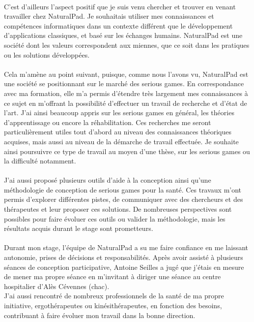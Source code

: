 \paragraph{} C'est d'ailleurs l'aspect positif que je suis venu chercher et trouver en venant travailler chez NaturalPad. Je souhaitais utiliser mes connaissances et compétences informatiques dans un contexte différent que le développement d'applications classiques, et basé sur les échanges humains. NaturalPad est une société dont les valeurs correspondent aux miennes, que ce soit dans les pratiques ou les solutions développées.

\paragraph{} Cela m'amène au point suivant, puisque, comme nous l'avons vu, NaturalPad est une société se positionnant sur le marché des serious games. En correspondance avec ma formation, elle m'a permis d'étendre très largement mes connaissances à ce sujet en m'offrant la possibilité d'effectuer un travail de recherche et d'état de l'art. J'ai ainsi beaucoup appris sur les serious games en général, les théories d'apprentissage ou encore la réhabilitation. Ces recherches me seront particulièrement utiles tout d'abord au niveau des connaissances théoriques acquises, mais aussi au niveau de la démarche de travail effectuée. Je souhaite ainsi poursuivre ce type de travail au moyen d'une thèse, sur les serious games ou la difficulté notamment. 

\paragraph{} J'ai aussi proposé plusieurs outils d'aide à la conception ainsi qu'une méthodologie de conception  de serious games pour la santé. Ces travaux m'ont permis d'explorer différentes pistes, de communiquer avec des chercheurs et des thérapeutes et 
leur proposer ces solutions. De nombreuses perspectives sont possibles pour faire évoluer ces outils ou valider la méthodologie, mais les résultats acquis durant le stage sont prometteurs.

\paragraph{} Durant mon stage, l'équipe de NaturalPad a su me faire confiance en me laissant autonomie, prises de décisions et responsabilités. Après avoir assisté à plusieurs séances de conception participative, Antoine Seilles a jugé que j'étais en mesure de mener ma propre séance en m'invitant à diriger une séance au centre hospitalier d'Alès Cévennes (\gls{chac}). \\
J'ai aussi rencontré de nombreux professionnels de la santé de ma propre initiative, ergothérapeutes ou kinésithérapeutes, en fonction des besoins, contribuant à faire évoluer mon travail dans la bonne direction.

